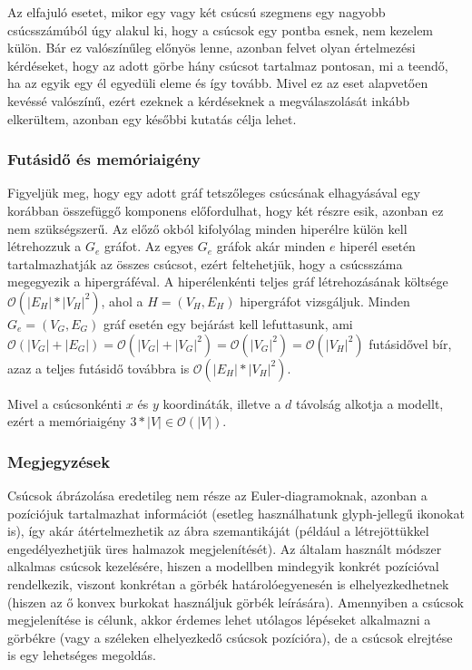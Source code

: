 \begin{note}
Az elfajuló esetet, mikor egy vagy két csúcsú szegmens egy nagyobb csúcsszámúból úgy alakul ki, hogy a csúcsok egy pontba esnek, nem kezelem külön. Bár ez valószínűleg előnyös lenne, azonban felvet olyan értelmezési kérdéseket, hogy az adott görbe hány csúcsot tartalmaz pontosan, mi a teendő, ha az egyik egy él egyedüli eleme és így tovább. Mivel ez az eset alapvetően kevéssé valószínű, ezért ezeknek a kérdéseknek a megválaszolását inkább elkerültem, azonban egy későbbi kutatás célja lehet.
\end{note}

\subsubsection{Futásidő és memóriaigény}

Figyeljük meg, hogy egy adott gráf tetszőleges csúcsának elhagyásával egy korábban összefüggő komponens előfordulhat, hogy két részre esik, azonban ez nem szükségszerű. Az előző okból kifolyólag minden hiperélre külön kell létrehozzuk a $G_e$ gráfot. Az egyes $G_e$ gráfok akár minden $e$ hiperél esetén tartalmazhatják az összes csúcsot, ezért feltehetjük, hogy a csúcsszáma megegyezik a hipergráféval. A hiperélenkénti teljes gráf létrehozásának költsége $\mathcal{O}(|E_H|*|V_H|^2)$, ahol a $H=(V_H,E_H)$ hipergráfot vizsgáljuk. Minden $G_e=(V_G,E_G)$ gráf esetén egy bejárást kell lefuttasunk, ami $\mathcal{O}(|V_G|+|E_G|) = \mathcal{O}(|V_G| + |V_G|^2) = \mathcal{O}(|V_G|^2) = \mathcal{O}(|V_H|^2)$ futásidővel bír, azaz a teljes futásidő továbbra is $\mathcal{O}(|E_H|*|V_H|^2)$.


Mivel a csúcsonkénti $x$ és $y$ koordináták, illetve a $d$ távolság alkotja a modellt, ezért a memóriaigény $3*|V| \in \mathcal{O}(|V|)$.

\subsubsection{Megjegyzések}

Csúcsok ábrázolása eredetileg nem része az Euler-diagramoknak, azonban a pozíciójuk tartalmazhat információt (esetleg használhatunk  glyph-jellegű ikonokat is), így akár átértelmezhetik az ábra szemantikáját (például a létrejöttükkel engedélyezhetjük üres halmazok megjelenítését). Az általam használt módszer alkalmas csúcsok kezelésére, hiszen a modellben mindegyik konkrét pozícióval rendelkezik, viszont konkrétan a görbék határolóegyenesén is elhelyezkedhetnek (hiszen az ő konvex burkokat használjuk görbék leírására). Amennyiben a csúcsok megjelenítése is célunk, akkor érdemes lehet utólagos lépéseket alkalmazni a görbékre (vagy a széleken elhelyezkedő csúcsok pozícióra), de a csúcsok elrejtése is egy lehetséges megoldás.


